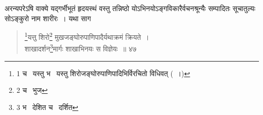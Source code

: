 \documentclass[11pt, openany]{book}
\begin{document}
अरन्यपरेऽषि वाक्ये यद्गर्भीभूतं हृदयस्थं वस्तु तन्निष्ठो योऽभिनयोऽङ्गविकारैर्वचनश्रून्यैः सम्पादितः सूचातुल्यः सोऽङ्कुरो नाम शारीरः~। यथा साग\textendash\ 

\newpage

\begin{quote}
 {\na \renewcommand{\thefootnote}{1}\footnote{1 च \textendash\ यस्तु भ \textendash\ यस्तु शिरोजङ्घोरुपाणिपादिभिर्विरचितो विधिवत् (~।) }यत्तु शिरो\renewcommand{\thefootnote}{2}\footnote{2 च \textendash\ भुज } मुखजङ्घोरुपाणिपादैर्यथाक्रमं क्रियते~। \\
शाखादर्शन\renewcommand{\thefootnote}{3}\footnote{3 भ \textendash\ देशित च \textendash\ दर्शित }मार्गः शाखाभिनयः स विज्ञेयः~॥ ४७ }
\end{quote} 

\begin{sloppypar}

\end{sloppypar}
\noindent
\end{document}
